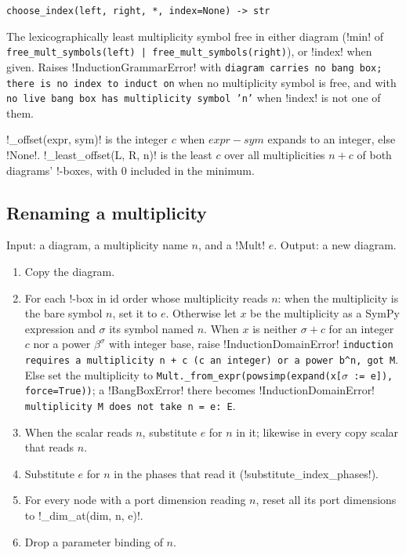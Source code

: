 \begin{signature}
\texttt{choose\_\allowbreak{}index(\allowbreak{}left,\allowbreak{} right,\allowbreak{} *,\allowbreak{} index=None) -> str}

The lexicographically least multiplicity symbol free in either diagram (\py!min! of \texttt{free\_\allowbreak{}mult\_\allowbreak{}symbols(\allowbreak{}left) | free\_\allowbreak{}mult\_\allowbreak{}symbols(\allowbreak{}right)}), or \code!index! when given. Raises \py!InductionGrammarError! with \texttt{diagram carries no bang box; there is no index to induct on} when no multiplicity symbol is free, and with \texttt{no live bang box has multiplicity symbol 'n'} when \code!index! is not one of them.
\end{signature}

\py!_offset(expr, sym)! is the integer $c$ when $\mathit{expr}-\mathit{sym}$ expands to an integer, else \py!None!. \py!_least_offset(L, R, n)! is the least $c$ over all multiplicities $n+c$ of both diagrams' !-boxes, with $0$ included in the minimum.

\subsection{Renaming a multiplicity}\label{sec:kernel-rename}

\begin{algorithm}\label{alg:kernel-rename}
Input: a diagram, a multiplicity name $n$, and a \py!Mult! $e$. Output: a new diagram.
\begin{enumerate}
\item Copy the diagram.
\item For each !-box in id order whose multiplicity reads $n$: when the multiplicity is the bare symbol $n$, set it to $e$. Otherwise let $x$ be the multiplicity as a SymPy expression and $\sigma$ its symbol named $n$. When $x$ is neither $\sigma+c$ for an integer $c$ nor a power $\beta^{\sigma}$ with integer base, raise \py!InductionDomainError! \texttt{induction requires a multiplicity n + c (\allowbreak{}c an integer) or a power b\^{}n,\allowbreak{} got M}. Else set the multiplicity to \texttt{Mult.\allowbreak{}\_\allowbreak{}from\_\allowbreak{}expr(\allowbreak{}powsimp(\allowbreak{}expand(\allowbreak{}x[$\sigma$ := e]),\allowbreak{} force=True))}; a \py!BangBoxError! there becomes \py!InductionDomainError! \texttt{multiplicity M does not take n = e: E}.
\item When the scalar reads $n$, substitute $e$ for $n$ in it; likewise in every copy scalar that reads $n$.
\item Substitute $e$ for $n$ in the phases that read it (\py!substitute_index_phases!).
\item For every node with a port dimension reading $n$, reset all its port dimensions to \py!_dim_at(dim, n, e)!.
\item Drop a parameter binding of $n$.
\end{enumerate}
\end{algorithm}

